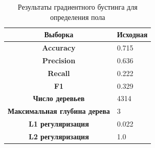 \begin{table}[t]
\centering
\begin{tabular}{|c|l|}
\hline
\textbf{Выборка}            & Исходная \\ \hline
\textbf{Accuracy}           & 0.715    \\ \hline
\textbf{Precision}          & 0.636    \\ \hline
\textbf{Recall}             & 0.222    \\ \hline
\textbf{F1}                 & 0.329   \\ \hline
\textbf{Число деревьев}      & 4314     \\ \hline
\textbf{Максимальная глубина дерева}         & 3        \\ \hline
\textbf{L1 регуляризация}         & 0.022    \\ \hline
\textbf{L2 регуляризация}        & 1.0      \\ \hline
\end{tabular}
\caption{Результаты градиентного бустинга для определения пола}
\label{gradient boosting gender table}
\end{table}


